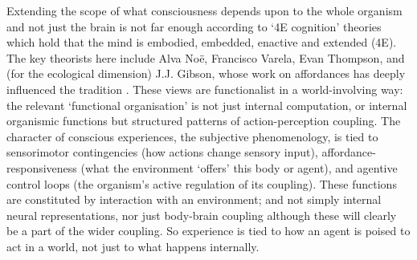 \documentclass[11pt, a4paper, onecolumn, gdm]{google}
\begin{document}
Extending the scope of what consciousness depends upon to the whole organism and not just the brain is not far enough according to `4E cognition' theories which hold that the mind is embodied, embedded, enactive and extended (4E).
The key theorists here include Alva Noë, Francisco Varela, Evan Thompson, and (for the ecological dimension) J.J.
Gibson, whose work on affordances has deeply influenced the tradition \citetext{\citealp{noe2004}; ; \citealp{gibson1979}}.
These views are functionalist in a world-involving way: the relevant `functional organisation' is not just internal computation, or internal organismic functions but structured patterns of action-perception coupling.
The character of conscious experiences, the subjective phenomenology, is tied to sensorimotor contingencies (how actions change sensory input), affordance-responsiveness (what the environment `offers' this body or agent), and agentive control loops (the organism's active regulation of its coupling).
These functions are constituted by interaction with an environment; and not simply internal neural representations, nor just body-brain coupling although these will clearly be a part of the wider coupling.
So experience is tied to how an agent is poised to act in a world, not just to what happens internally.
\end{document}
